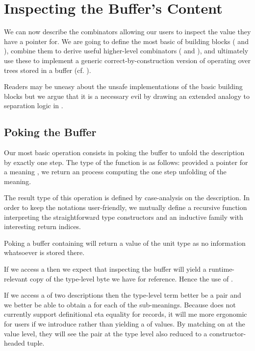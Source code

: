 
\section{Inspecting the Buffer's Content}\label{sec:poking}

We can now describe the combinators allowing our users to inspect
the value they have a pointer for.
%
We are going to define the most basic of building blocks
( and ),
combine them to derive useful higher-level combinators
( and ),
and ultimately use these to implement a generic correct-by-construction
version of  operating over trees stored in a buffer
(cf. ).

Readers may be uneasy about the unsafe implementations of the basic
building blocks but we argue that it is a necessary evil by drawing
an extended analogy to separation logic in .

\subsection{Poking the Buffer}

Our most basic operation consists in poking the buffer to unfold
the description by exactly one step.
%
The type of the function is as follows: provided a pointer for
a meaning , we return an  process computing
the one step unfolding of the meaning.


The result type of this operation is defined by case-analysis on the
description. In order to keep the notations user-friendly, we
mutually define
a recursive function  interpreting the straightforward type constructors
and an inductive family  with interesting return indices.


Poking a buffer containing  will return a value of
the unit type as no information whatsoever is stored there.

If we access a  then we expect that inspecting the
buffer will yield a runtime-relevant copy of the type-level byte we
have for reference. Hence the use of .

If we access a  of two descriptions then the type-level term
better be a pair and we better be able to obtain a 
for each of the sub-meanings.
%
Because \idris{} does not currently support definitional eta equality
for records, it will me more ergonomic for users if we introduce
 rather than yielding a  of values.
By matching on  at the value level, they will see the
pair at the type level also reduced to a constructor-headed tuple.

